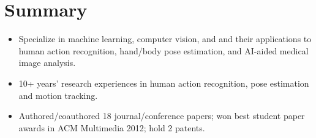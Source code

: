 \section{Summary}
\begin{itemize}[leftmargin=*]
    \item \vspace{-3pt}Specialize in machine learning, computer vision, and  and their applications to human action recognition, hand/body pose estimation, and AI-aided medical image analysis.
    \item \vspace{-4pt}10+ years' research experiences in human action recognition, pose estimation and motion tracking. 
    \item \vspace{-4pt}Authored/coauthored 18 journal/conference papers; won best student paper awards in ACM Multimedia 2012; hold 2 patents.
\end{itemize}